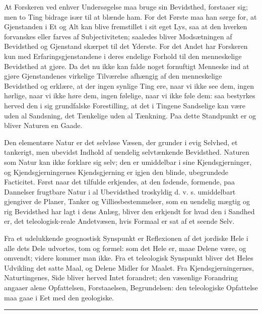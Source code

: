 \documentclass[12pt,a4paper]{book}
\newcommand{\streg}{\begin{center}\rule{2cm}{0.4pt}\end{center}}
\begin{document}
At Forskeren ved enhver Undersøgelse maa bruge sin Bevidsthed, forstaaer
sig; men to Ting bidrage især til at blænde ham. For det Første maa han
sørge for, at Gjenstanden i Et og Alt kan blive fremstillet i sit eget
Lys, saa at den hverken forvanskes eller farves af Subjectiviteten;
saaledes bliver Modsætningen af Bevidsthed og Gjenstand skærpet til det
Yderste. For det Andet har Forskeren kun med Erfaringsgjenstandene i deres
endelige Forhold til den menneskelige Bevidsthed at gjøre. Da det nu ikke
kan falde noget fornuftigt Menneske ind at gjøre Gjenstandenes
virkelige Tilværelse afhængig af den menneskelige Bevidsthed og erklære,
at der ingen synlige Ting ere, naar vi ikke see dem, ingen hørlige, naar
vi ikke høre dem, ingen følelige, naar vi ikke føle dem: saa bestyrkes
herved den i sig grundfalske Forestilling, at det i Tingene Sandselige kan
være uden al Sandsning, det Tænkelige uden al Tænkning. Paa dette
Standpunkt er og bliver Naturen en Gaade.

Den elementære Natur er det selvløse Væsen, der grunder i evig Selvhed, et
tankerigt, men ubevidst Indhold af uendelig selvtænkende Bevidsthed.
Naturen som Natur kan ikke forklare sig selv; den er umiddelbar i sine
Kjendsgjerninger, og Kjendsgjerningernes Kjendsgjerning er igjen den
blinde, ubegrundede Facticitet. Først naar det tilfulde erkjendes, at den
fødende, formende, paa Dannelser frugtbare Natur i al Ubevidsthed
troskyldig d. v. s. umiddelbart gjengiver de Planer, Tanker og
Villiesbestemmelser, som en uendelig mægtig og rig Bevidsthed har lagt i
dens Anlæg, bliver den erkjendt for hvad den i Sandhed er, det
teleologisk-reale Andetvæsen, hvis Formaal er sat af et seende Selv.

Fra et udelukkende geognostisk Synspunkt er Reflexionen af det jordiske
Hele i alle dets Dele udvortes, tom og formel: som det Hele er, maae
Delene være, og omvendt; videre kommer man ikke. Fra et teleologisk
Synspunkt bliver det Heles Udvikling det satte Maal, og Delene Midler for
Maalet. Fra Kjendsgjerningernes, Naturtingenes, Side bliver herved Intet
forandret; den væsenlige Forandring angaaer alene Opfattelsen,
Forstaaelsen, Begrundelsen: den teleologiske Opfattelse maa gaae i Eet med
den geologiske.

\streg
\end{document}
